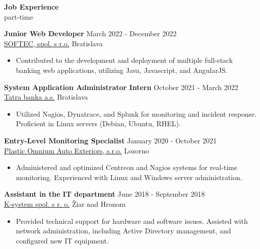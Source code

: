 \documentclass[12pt]{article}
\begin{document}
\vspace{0.2in} %

\begin{center}
	{\noindent \bfseries Job Experience} \\
	{part-time}
\end{center}

\noindent
{\bfseries Junior Web Developer} \hfill March 2022 - December 2022 \\  
\noindent \href{https://www.softec.sk/en/about-us}{SOFTEC, spol. s r.o.} \hfill Bratislava 
\begin{itemize} \itemsep -2pt %
	\item Contributed to the development and deployment of multiple full-stack banking web applications, utilizing Java, Javascript, and AngularJS.
\end{itemize}


\noindent
{\bfseries System Application Administrator Intern} \hfill October 2021 - March 2022 \\  
\noindent \href{https://www.tatrabanka.sk/en/about-bank/about-tatra-banka/}{Tatra banka a.s.} \hfill Bratislava 
\begin{itemize} \itemsep -2pt %
\item Utilized Nagios, Dynatrace, and Splunk for monitoring and incident response. Proficient in Linux servers (Debian, Ubuntu, RHEL).
\end{itemize}

\noindent
{\bfseries Entry-Level Monitoring Specialist} \hfill January 2020 - October 2021 \\  
\noindent \href{https://www.opmobility.com/en/plastic-omnium-is-now-opmobility/}{Plastic Omnium Auto Exteriors, s.r.o.} \hfill Lozorno 
\begin{itemize} \itemsep -2pt %
\item Administered and optimized Centreon and Nagios systems for real-time monitoring. Experienced with Linux and Windows server administration.
\end{itemize}

\noindent
{\bfseries Assistant in the IT department} \hfill June 2018 - September 2018 \\  
\noindent  \href{https://www.ksystem.sk/}{K-system spol. s r. o.} \hfill Žiar nad Hronom   
\begin{itemize} \itemsep -2pt %
\item Provided technical support for hardware and software issues. Assisted with network administration, including Active Directory management, and configured new IT equipment.
\end{itemize}
\end{document}
